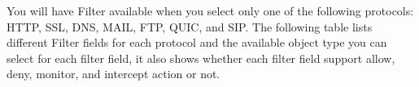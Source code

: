You will have Filter available when you select only one of the following protocols: HTTP, SSL, DNS, MAIL, FTP, QUIC, and SIP. 
The following table lists different Filter fields for each protocol and the available object type you can select for each filter field, 
it also shows whether each filter field support allow, deny, monitor, and intercept action or not. 


%
